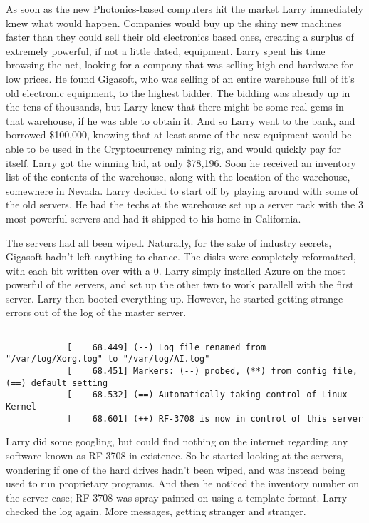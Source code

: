 \documentclass{article}
\begin{document}
		As soon as the new Photonics-based computers hit the market Larry immediately knew what would happen. Companies would buy up the shiny new machines faster than they could sell their old electronics based ones, creating a surplus of extremely powerful, if not a little dated, equipment. Larry spent his time browsing the net, looking for a company that was selling high end hardware for low prices. He found Gigasoft, who was selling of an entire warehouse full of it's old electronic equipment, to the highest bidder. The bidding was already up in the tens of thousands, but Larry knew that there might be some real gems in that warehouse, if he was able to obtain it. And so Larry went to the bank, and borrowed \$100,000, knowing that at least some of the new equipment would be able to be used in the Cryptocurrency mining rig, and would quickly pay for itself. Larry got the winning bid, at only \$78,196. Soon he received an inventory list of the contents of the warehouse, along with the location of the warehouse, somewhere in Nevada. Larry decided to start off by playing around with some of the old servers. He had the techs at the warehouse set up a server rack with the 3 most powerful servers and had it shipped to his home in California. 
		
		The servers had all been wiped. Naturally, for the sake of industry secrets, Gigasoft hadn't left anything to chance. The disks were completely reformatted, with each bit written over with a 0. Larry simply installed Azure on the most powerful of the servers, and set up the other two to work parallell with the first server. Larry then booted everything up. However, he started getting strange errors out of the log of the master server. \\
		
		\begin{lstlisting}
		
			[    68.449] (--) Log file renamed from "/var/log/Xorg.log" to "/var/log/AI.log"
			[    68.451] Markers: (--) probed, (**) from config file, (==) default setting
			[    68.532] (==) Automatically taking control of Linux Kernel
			[    68.601] (++) RF-3708 is now in control of this server
		\end{lstlisting}
		
		Larry did some googling, but could find nothing on the internet regarding any software known as RF-3708 in existence. So he started looking at the servers, wondering if one of the hard drives hadn't been wiped, and was instead being used to run proprietary programs. And then he noticed the inventory number on the server case; RF-3708 was spray painted on using a template format. Larry checked the log again. More messages, getting stranger and stranger.
		
\end{document}
